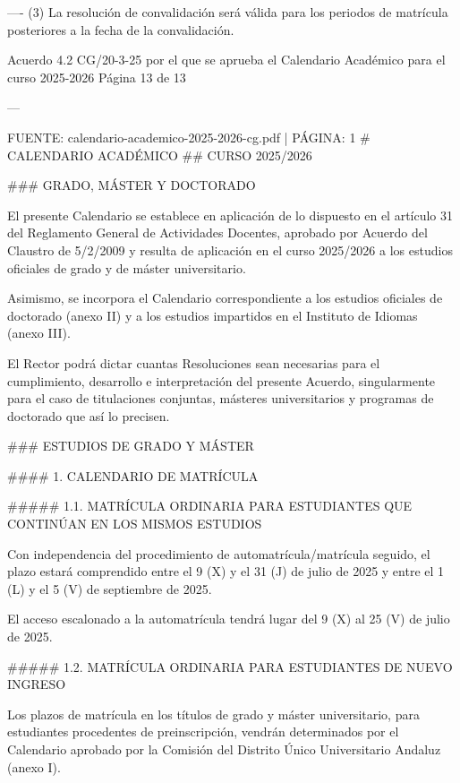 \documentclass{article}
\begin{document}
\begin{itemize}
\begin{itemize}
\begin{scriptsize}
                  ----
                  (3) La resolución de convalidación será válida para los periodos de matrícula posteriores a la fecha de la convalidación.

                  Acuerdo 4.2 CG/20-3-25 por el que se aprueba el Calendario Académico para el curso 2025-2026      Página 13 de 13

                  ---

                  FUENTE: calendario-academico-2025-2026-cg.pdf | PÁGINA: 1
                  \# CALENDARIO ACADÉMICO
                  \#\# CURSO 2025/2026

                  \#\#\# GRADO, MÁSTER Y DOCTORADO

                  El presente Calendario se establece en aplicación de lo dispuesto en el artículo 31 del Reglamento General de Actividades Docentes, aprobado por Acuerdo del Claustro de 5/2/2009 y resulta de aplicación en el curso 2025/2026 a los estudios oficiales de grado y de máster universitario.

                  Asimismo, se incorpora el Calendario correspondiente a los estudios oficiales de doctorado (anexo II) y a los estudios impartidos en el Instituto de Idiomas (anexo III).

                  El Rector podrá dictar cuantas Resoluciones sean necesarias para el cumplimiento, desarrollo e interpretación del presente Acuerdo, singularmente para el caso de titulaciones conjuntas, másteres universitarios y programas de doctorado que así lo precisen.

                  \#\#\# ESTUDIOS DE GRADO Y MÁSTER

                  \#\#\#\# 1. CALENDARIO DE MATRÍCULA

                  \#\#\#\#\# 1.1. MATRÍCULA ORDINARIA PARA ESTUDIANTES QUE CONTINÚAN EN LOS MISMOS ESTUDIOS

                  Con independencia del procedimiento de automatrícula/matrícula seguido, el plazo estará comprendido entre el 9 (X) y el 31 (J) de julio de 2025 y entre el 1 (L) y el 5 (V) de septiembre de 2025.

                  El acceso escalonado a la automatrícula tendrá lugar del 9 (X) al 25 (V) de julio de 2025.

                  \#\#\#\#\# 1.2. MATRÍCULA ORDINARIA PARA ESTUDIANTES DE NUEVO INGRESO

                  Los plazos de matrícula en los títulos de grado y máster universitario, para estudiantes procedentes de preinscripción, vendrán determinados por el Calendario aprobado por la Comisión del Distrito Único Universitario Andaluz (anexo I).


\end{scriptsize}
\end{itemize}
\end{itemize}
\end{document}
